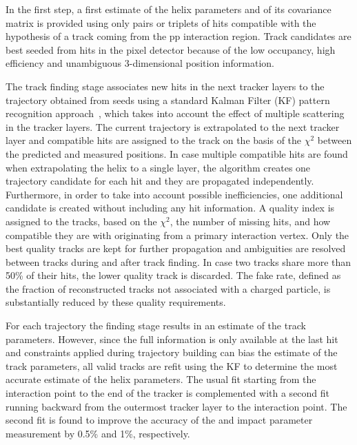 In the first step, a first estimate of the helix parameters and of its covariance matrix is provided using only pairs or triplets of hits compatible with the hypothesis of a track coming from the pp interaction region. Track candidates are best seeded from hits in the pixel detector because of the low occupancy, high efficiency and unambiguous 3-dimensional position information.

The track finding stage associates new hits in the next tracker layers to the trajectory obtained from seeds using a standard Kalman Filter (KF) pattern recognition approach~\cite{Billoir:1989mh,Fruhwirth:1987fm}, which takes into account the effect of multiple scattering in the tracker layers. The current trajectory is extrapolated to the next tracker layer and compatible hits are assigned to the track on the basis of the $\chi^2$ between the predicted and measured positions. In case multiple compatible hits are found when extrapolating the helix to a single layer, the algorithm creates one trajectory candidate for each hit and they are propagated independently. Furthermore, in order to take into account possible inefficiencies, one additional candidate is created without including any hit information. A quality index is assigned to the tracks, based on the $\chi^2$, the number of missing hits, and how compatible they are with originating from a primary interaction vertex. Only the best quality tracks are kept for further propagation and ambiguities are resolved between tracks during and after track finding. In case two tracks share more than 50\% of their hits, the lower quality track is discarded. The fake rate, defined as the fraction of reconstructed tracks not associated with a charged particle, is substantially reduced by these quality requirements.

For each trajectory the finding stage results in an estimate of the track parameters. However, since the full information is only available at the last hit and constraints applied during trajectory building can bias the estimate of the track parameters, all valid tracks are refit using the KF to determine the most accurate estimate of the helix parameters. The usual fit starting from the interaction point to the end of the tracker is complemented with a second fit running backward from the outermost tracker layer to the interaction point. The second fit is found to improve the accuracy of the \pt and impact parameter measurement by 0.5\% and 1\%, respectively.\\

